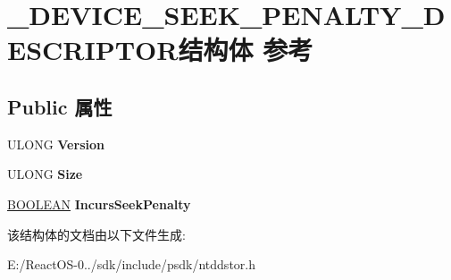 \hypertarget{struct___d_e_v_i_c_e___s_e_e_k___p_e_n_a_l_t_y___d_e_s_c_r_i_p_t_o_r}{}\section{\+\_\+\+D\+E\+V\+I\+C\+E\+\_\+\+S\+E\+E\+K\+\_\+\+P\+E\+N\+A\+L\+T\+Y\+\_\+\+D\+E\+S\+C\+R\+I\+P\+T\+O\+R结构体 参考}
\label{struct___d_e_v_i_c_e___s_e_e_k___p_e_n_a_l_t_y___d_e_s_c_r_i_p_t_o_r}
\subsection*{Public 属性}
\begin{DoxyCompactItemize}
\item 
\mbox{\label{struct___d_e_v_i_c_e___s_e_e_k___p_e_n_a_l_t_y___d_e_s_c_r_i_p_t_o_r_a5e199793abd4d1213d9a95e9985cffcd}} 
U\+L\+O\+NG {\bfseries Version}
\item 
\mbox{\label{struct___d_e_v_i_c_e___s_e_e_k___p_e_n_a_l_t_y___d_e_s_c_r_i_p_t_o_r_ac62f5d7b10c14c84ac12e4c9254e323b}} 
U\+L\+O\+NG {\bfseries Size}
\item 
\mbox{\label{struct___d_e_v_i_c_e___s_e_e_k___p_e_n_a_l_t_y___d_e_s_c_r_i_p_t_o_r_a3fe9d0c67191ffb325d5400d015dd61c}} 
\hyperlink{_processor_bind_8h_a112e3146cb38b6ee95e64d85842e380a}{B\+O\+O\+L\+E\+AN} {\bfseries Incurs\+Seek\+Penalty}
\end{DoxyCompactItemize}


该结构体的文档由以下文件生成\+:\begin{DoxyCompactItemize}
\item 
E\+:/\+React\+O\+S-\/0../sdk/include/psdk/ntddstor.\+h\end{DoxyCompactItemize}
